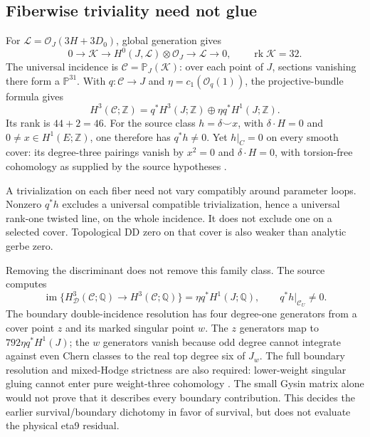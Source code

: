 \documentclass[11pt,a4paper]{article}
\begin{document}
\subsection{Fiberwise triviality need not glue}
\label{sec:deligne-incidence}
For \(\mathcal L=\mathcal O_J(3H+3D_0)\), global generation gives
\[
 0\to\mathcal K\to H^0(J,\mathcal L)\otimes\mathcal O_J
       \to\mathcal L\to0,\qquad \operatorname{rk}\mathcal K=32 .
\]
The universal incidence is \(\mathcal C=\mathbb P_J(\mathcal K)\):
over each point of \(J\), sections vanishing there form a
\(\mathbb P^{31}\). With \(q:\mathcal C\to J\) and
\(\eta=c_1(\mathcal O_q(1))\), the projective-bundle formula gives
\[
 H^3(\mathcal C;\mathbb Z)=
 q^*H^3(J;\mathbb Z)\oplus\eta q^*H^1(J;\mathbb Z).
 \tag{D3}\label{eq:deligne-incidence}
\]
Its rank is \(44+2=46\). For the source class \(h=\delta\smile x\),
with \(\delta\cdot H=0\) and \(0\ne x\in H^1(E;\mathbb Z)\),
one therefore has \(q^*h\ne0\). Yet \(h|_C=0\) on every smooth cover:
its degree-three pairings vanish by \(x^2=0\) and
\(\delta\cdot H=0\), with torsion-free cohomology as supplied by
the source hypotheses \cite{PreprojectionIncidenceDD2026}.

A trivialization on each fiber need not vary compatibly around
parameter loops. Nonzero \(q^*h\) excludes a universal compatible
trivialization, hence a universal rank-one twisted line, on the whole
incidence. It does not exclude one on a selected cover. Topological
DD zero on that cover is also weaker than analytic gerbe zero.

Removing the discriminant does not remove this family class.
The source computes
\[
 \operatorname{im}\{H^3_{\mathcal D}(\mathcal C;\mathbb Q)
                         \to H^3(\mathcal C;\mathbb Q)\}
 =\eta q^*H^1(J;\mathbb Q),\qquad
 q^*h|_{\mathcal C_U}\ne0 .
 \tag{D4}\label{eq:deligne-support}
\]
The boundary double-incidence resolution has four degree-one
generators from a cover point \(z\) and its marked singular point
\(w\). The \(z\) generators map to \(792\eta q^*H^1(J)\);
the \(w\) generators vanish because odd degree cannot integrate
against even Chern classes to the real top degree six of \(J_w\).
The full boundary resolution and mixed-Hodge strictness are also
required: lower-weight singular gluing cannot enter pure weight-three
cohomology \cite{PreprojectionSmoothDD2026}. The small Gysin matrix
alone would not prove that it describes every boundary contribution.
This decides the earlier survival/boundary dichotomy in favor of
survival, but does not evaluate the physical eta9 residual.
\end{document}
